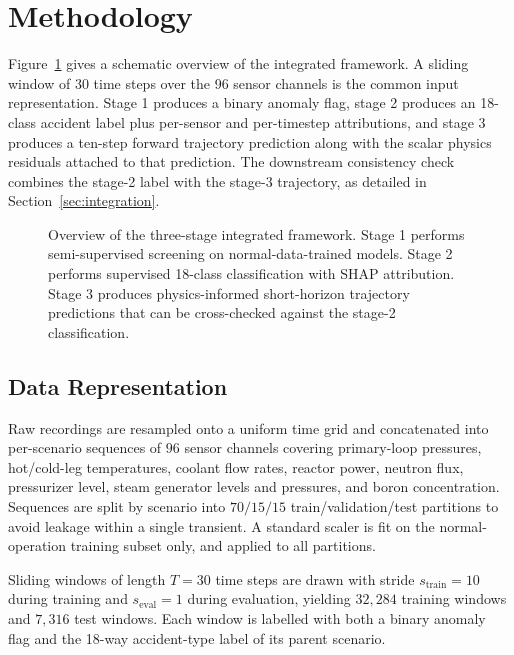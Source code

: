 \section{Methodology}
\label{sec:method}

Figure~\ref{fig:pipeline} gives a schematic overview of the integrated framework. A sliding window of 30 time steps over the 96 sensor channels is the common input representation. Stage 1 produces a binary anomaly flag, stage 2 produces an 18-class accident label plus per-sensor and per-timestep attributions, and stage 3 produces a ten-step forward trajectory prediction along with the scalar physics residuals attached to that prediction. The downstream consistency check combines the stage-2 label with the stage-3 trajectory, as detailed in Section~\ref{sec:integration}.

\begin{figure}[H]
    \centering
    \caption{Overview of the three-stage integrated framework. Stage 1 performs semi-supervised screening on normal-data-trained models. Stage 2 performs supervised 18-class classification with SHAP attribution. Stage 3 produces physics-informed short-horizon trajectory predictions that can be cross-checked against the stage-2 classification.}
    \label{fig:pipeline}
\end{figure}

\subsection{Data Representation}
\label{sec:data-rep}

Raw \nppad{} recordings are resampled onto a uniform time grid and concatenated into per-scenario sequences of $96$ sensor channels covering primary-loop pressures, hot/cold-leg temperatures, coolant flow rates, reactor power, neutron flux, pressurizer level, steam generator levels and pressures, and boron concentration. Sequences are split by scenario into $70/15/15$ train/validation/test partitions to avoid leakage within a single transient. A standard scaler is fit on the normal-operation training subset only, and applied to all partitions.

Sliding windows of length $T = 30$ time steps are drawn with stride $s_{\text{train}} = 10$ during training and $s_{\text{eval}} = 1$ during evaluation, yielding $32{,}284$ training windows and $7{,}316$ test windows. Each window is labelled with both a binary anomaly flag and the 18-way accident-type label of its parent scenario.

